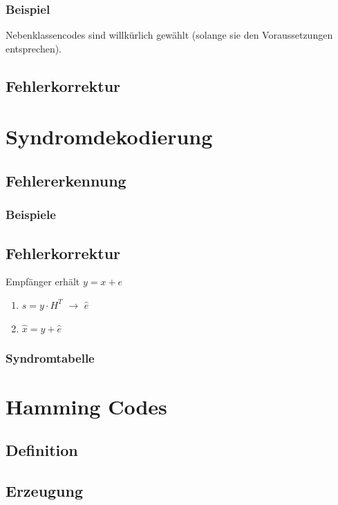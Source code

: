 \subsubsection*{Beispiel}
Nebenklassencodes sind willkürlich gewählt (solange sie den Voraussetzungen entsprechen).
\subsection{Fehlerkorrektur}

\section{Syndromdekodierung}
\subsection{Fehlererkennung}
\subsubsection*{Beispiele}
\subsection{Fehlerkorrektur}
Empfänger erhält $y=x+e$
\begin{enumerate}
\item $s=y\cdot H^T$ $\to$ $\hat{e}$
\item $\hat{x}=y+\hat{e}$
\end{enumerate}
\subsubsection*{Syndromtabelle}

\section{Hamming Codes}
\subsection{Definition}
\subsection{Erzeugung}
